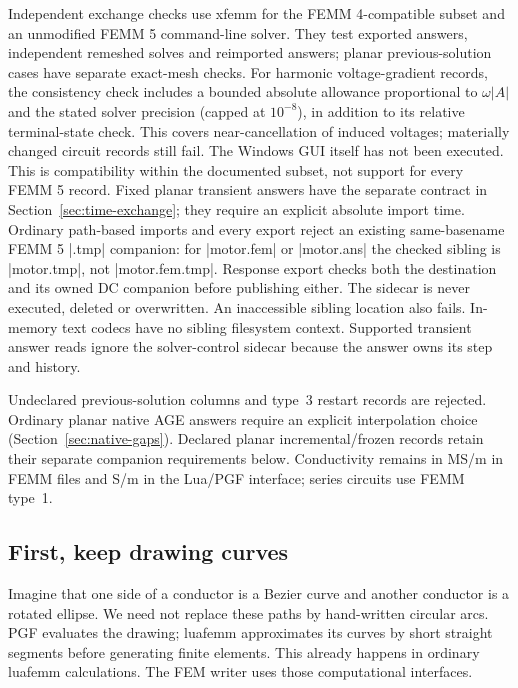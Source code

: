 Independent exchange checks use xfemm for the FEMM 4-compatible subset and
an unmodified FEMM 5 command-line solver. They test exported answers, independent
remeshed solves and reimported answers; planar previous-solution cases have
separate exact-mesh checks. For harmonic voltage-gradient records, the consistency check includes a
bounded absolute allowance proportional to $\omega|A|$ and the stated solver
precision (capped at $10^{-8}$), in addition to its relative terminal-state
check. This covers near-cancellation of induced voltages; materially changed
circuit records still fail. The Windows GUI itself has not been executed.
This is compatibility within the documented subset, not support for every
FEMM 5 record. Fixed planar transient answers have the separate contract in
Section~\ref{sec:time-exchange}; they require an explicit absolute import time.
Ordinary path-based imports and every export reject an existing same-basename
FEMM 5 |.tmp| companion: for |motor.fem| or |motor.ans| the checked sibling is
|motor.tmp|, not |motor.fem.tmp|. Response export checks both the destination and
its owned DC companion before publishing either. The sidecar is never executed,
deleted or overwritten. An inaccessible sibling location also fails. In-memory
text codecs have no sibling filesystem context. Supported transient answer reads
ignore the solver-control sidecar because the answer owns its step and history.

Undeclared previous-solution columns and type~3 restart records are rejected.
Ordinary planar native AGE answers require an explicit interpolation choice
(Section~\ref{sec:native-gaps}). Declared planar incremental/frozen records retain
their separate companion requirements below. Conductivity remains in MS/m in
FEMM files and S/m in the Lua/PGF interface; series circuits use FEMM type~1.

\subsection{First, keep drawing curves}

Imagine that one side of a conductor is a Bezier curve and another conductor
is a rotated ellipse. We need not replace these paths by hand-written circular
arcs. PGF evaluates the drawing; luafemm approximates its curves by short straight
segments before generating finite elements. This already happens in ordinary
luafemm calculations. The FEM writer uses those computational interfaces.

